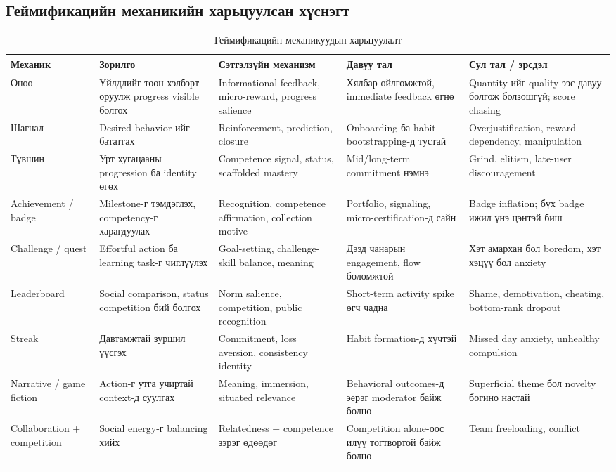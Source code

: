\begin{sloppy}
\section{Геймификацийн механикийн харьцуулсан хүснэгт}

\begin{table}[H]
\centering
\caption{Геймификацийн механикуудын харьцуулалт}
\label{tab:mechanics-comparison}
\small
\begin{tabular}{|p{2cm}|p{2.5cm}|p{2.5cm}|p{2.5cm}|p{2.5cm}|}
\hline
\textbf{Механик} & \textbf{Зорилго} & \textbf{Сэтгэлзүйн механизм} & \textbf{Давуу тал} & \textbf{Сул тал / эрсдэл} \\ \hline
Оноо & Үйлдлийг тоон хэлбэрт оруулж progress visible болгох & Informational feedback, micro-reward, progress salience & Хялбар ойлгомжтой, immediate feedback өгнө & Quantity-ийг quality-ээс давуу болгож болзошгүй; score chasing \\ \hline
Шагнал & Desired behavior-ийг бататгах & Reinforcement, prediction, closure & Onboarding ба habit bootstrapping-д тустай & Overjustification, reward dependency, manipulation \\ \hline
Түвшин & Урт хугацааны progression ба identity өгөх & Competence signal, status, scaffolded mastery & Mid/long-term commitment нэмнэ & Grind, elitism, late-user discouragement \\ \hline
Achievement / badge & Milestone-г тэмдэглэх, competency-г харагдуулах & Recognition, competence affirmation, collection motive & Portfolio, signaling, micro-certification-д сайн & Badge inflation; бүх badge ижил үнэ цэнтэй биш \\ \hline
Challenge / quest & Effortful action ба learning task-г чиглүүлэх & Goal-setting, challenge-skill balance, meaning & Дээд чанарын engagement, flow боломжтой & Хэт амархан бол boredom, хэт хэцүү бол anxiety \\ \hline
Leaderboard & Social comparison, status competition бий болгох & Norm salience, competition, public recognition & Short-term activity spike өгч чадна & Shame, demotivation, cheating, bottom-rank dropout \\ \hline
Streak & Давтамжтай зуршил үүсгэх & Commitment, loss aversion, consistency identity & Habit formation-д хүчтэй & Missed day anxiety, unhealthy compulsion \\ \hline
Narrative / game fiction & Action-г утга учиртай context-д суулгах & Meaning, immersion, situated relevance & Behavioral outcomes-д эерэг moderator байж болно & Superficial theme бол novelty богино настай \\ \hline
Collaboration + competition & Social energy-г balancing хийх & Relatedness + competence зэрэг өдөөдөг & Competition alone-оос илүү тогтвортой байж болно & Team freeloading, conflict \\ \hline
\end{tabular}
\end{table}


\end{sloppy}
